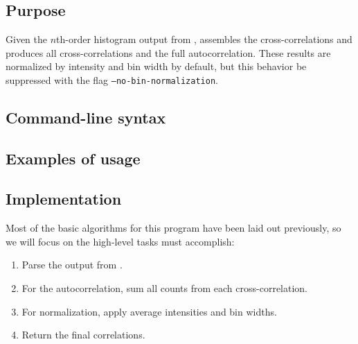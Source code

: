 \chapter{}
\section{Purpose}
Given the $n$th-order histogram output from , \GN{} assembles the cross-correlations and produces all cross-correlations and the full autocorrelation. These results are normalized by intensity and bin width by default, but this behavior be suppressed with the flag \texttt{--no-bin-normalization}.

\section{Command-line syntax}

\section{Examples of usage}

\section{Implementation}
Most of the basic algorithms for this program have been laid out previously, so we will focus on the high-level tasks \GN{} must accomplish:
\begin{enumerate}
\item Parse the output from .
\item For the autocorrelation, sum all counts from each cross-correlation.
\item For normalization, apply average intensities and bin widths.
\item Return the final correlations.
\end{enumerate}
